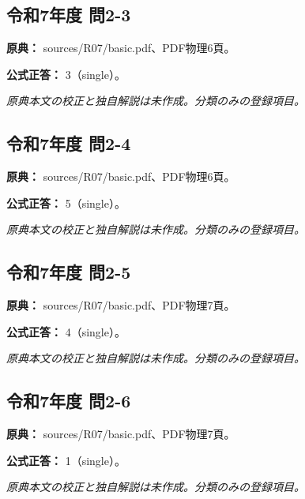 \subsection{令和7年度 問2-3}
\label{q:r07-reg-basic-2-3}

\noindent\textbf{原典：} sources/R07/basic.pdf、PDF物理6頁。

\textbf{公式正答：} 3（single）。

\par\textit{原典本文の校正と独自解説は未作成。分類のみの登録項目。}

\subsection{令和7年度 問2-4}
\label{q:r07-reg-basic-2-4}

\noindent\textbf{原典：} sources/R07/basic.pdf、PDF物理6頁。

\textbf{公式正答：} 5（single）。

\par\textit{原典本文の校正と独自解説は未作成。分類のみの登録項目。}

\subsection{令和7年度 問2-5}
\label{q:r07-reg-basic-2-5}

\noindent\textbf{原典：} sources/R07/basic.pdf、PDF物理7頁。

\textbf{公式正答：} 4（single）。

\par\textit{原典本文の校正と独自解説は未作成。分類のみの登録項目。}

\subsection{令和7年度 問2-6}
\label{q:r07-reg-basic-2-6}

\noindent\textbf{原典：} sources/R07/basic.pdf、PDF物理7頁。

\textbf{公式正答：} 1（single）。

\par\textit{原典本文の校正と独自解説は未作成。分類のみの登録項目。}
